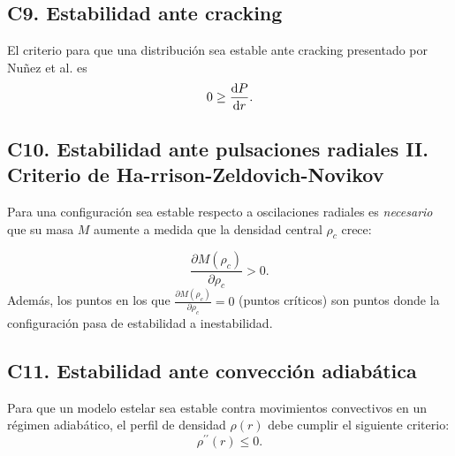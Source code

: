 \subsection*{C9. Estabilidad ante cracking}
 El criterio para que una distribución sea estable ante cracking presentado por Nuñez et al. \cite{Gonzalez2014} es
\begin{equation}
    0 \geq \dv{P}{r}.
\end{equation}

\subsection*{C10. Estabilidad ante pulsaciones radiales II. Criterio de Ha-rrison-Zeldovich-Novikov}
Para una configuración sea estable respecto a oscilaciones radiales es \emph{necesario} que su masa $M$ aumente a medida que la densidad central $\rho_{c}$ crece: 

\begin{equation}
    \frac { \partial M \left( \rho _ { c } \right) } { \partial \rho _ { c } } > 0.
\end{equation}
Además, los puntos en los que $\frac { \partial M \left( \rho _ { c } \right) } { \partial \rho _ { c } } = 0$ (puntos críticos) son puntos donde la configuración pasa de estabilidad a inestabilidad.



\subsection*{C11. Estabilidad ante convección adiabática}

Para que un modelo estelar sea estable contra movimientos convectivos en un régimen adiabático, el perfil de densidad $\rho(r)$ debe cumplir el siguiente criterio: 
\begin{equation}
    \rho ^ { \prime \prime } ( r ) \leq 0.
\end{equation}
